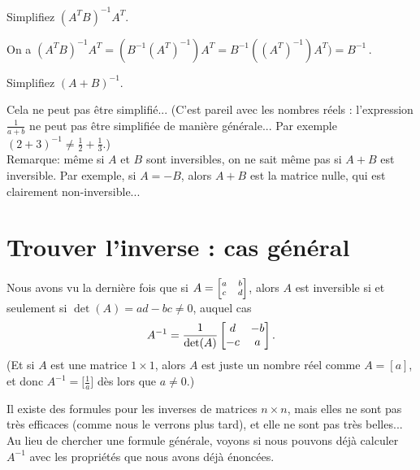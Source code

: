 \begin{myprob} Simplifiez  $(A^T B)^{-1}A^T$.

\begin{mysol} On a $(A^T B)^{-1}A^T = (B^{-1} (A^T)^{-1}) A^T = B^{-1} ((A^T)^{-1}) A^T) =B^{-1}$\,.
\end{mysol}\end{myprob}
\medskip

\begin{myprob} Simplifiez $(A+B)^{-1}$.

\begin{mysol}  Cela ne peut pas être simplifié... (C'est pareil avec les nombres réels : l'expression $\frac{1}{a+b}$ ne peut pas être simplifiée de manière générale... Par exemple $(2+3)^{-1} \neq \frac12 + \frac13$.)  \\
Remarque: même si $A$ et $B$ sont inversibles, on ne sait même pas si $A+B$ est inversible. Par exemple, si $A = -B$, alors $A+B$ est la matrice nulle, qui est clairement non-inversible... 
\end{mysol}\end{myprob}


 


\section{Trouver l'inverse : cas général}

Nous avons vu la dernière fois que si $A = \scriptsize\left[ \begin{matrix} a&b\\c&d \end{matrix} \right]$, alors $A$ est 
inversible si et seulement si $\det(A) = ad-bc \neq 0$, 
auquel cas
$$
A^{-1} = \frac{1}{\det(A)}\left[ \begin{matrix} d & -b\\-c&a \end{matrix} \right].
$$
(Et si $A$ est une matrice $1 \times 1$, alors $A$ est juste un nombre réel
comme $A = [a]$, et donc $A^{-1} = \big[\frac{1}{a}\big]$ dès lors que $a \neq 0$.)

Il existe des formules pour les inverses de matrices $n \times n$,  
mais elles ne sont pas très efficaces (comme nous le verrons plus tard), et elle ne sont pas très belles...
Au lieu de chercher une formule générale, voyons si nous pouvons déjà calculer $A^{-1}$ avec les propriétés que nous avons déjà énoncées.\\


